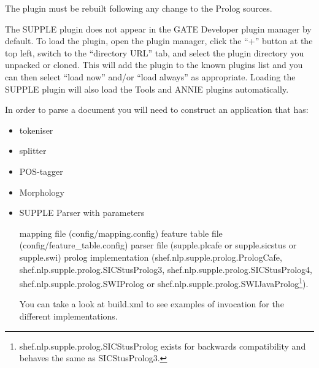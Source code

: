 The plugin must be rebuilt following any change to the Prolog sources.


The SUPPLE plugin does not appear in the GATE Developer plugin manager by
default.  To load the plugin, open the plugin manager, click the ``+'' button
at the top left, switch to the ``directory URL'' tab, and select the plugin
directory you unpacked or cloned.  This will add the plugin to the known
plugins list and you can then select ``load now'' and/or ``load always'' as
appropriate.  Loading the SUPPLE plugin will also load the Tools and ANNIE
plugins automatically.

In order to parse a document you will need to construct an application that has:

\begin{itemize}

\item tokeniser

\item splitter

\item POS-tagger

\item Morphology

\item SUPPLE Parser with parameters

\subitem mapping file (config/mapping.config)
\subitem feature table file (config/feature\_table.config)
\subitem parser file (supple.plcafe or supple.sicstus or
supple.swi)
\subitem prolog implementation (shef.nlp.supple.prolog.PrologCafe,\\
shef.nlp.supple.prolog.SICStusProlog3, shef.nlp.supple.prolog.SICStusProlog4,\\
shef.nlp.supple.prolog.SWIProlog or
shef.nlp.supple.prolog.SWIJavaProlog\footnote{shef.nlp.supple.prolog.SICStusProlog
exists for backwards compatibility and behaves the same as SICStusProlog3.}).

You can take a look at build.xml to see examples of invocation for
the different implementations.

\end{itemize}


